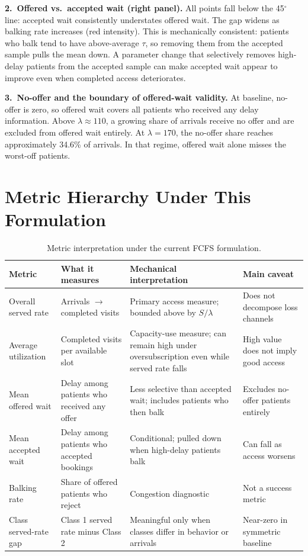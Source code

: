 \documentclass[11pt]{article}
\begin{document}
\textbf{2.~Offered vs.\ accepted wait (right panel).}
All points fall below the 45$^\circ$ line: accepted wait consistently
understates offered wait. The gap widens as balking rate increases (red
intensity). This is mechanically consistent: patients who balk tend to have
above-average $\tau$, so removing them from the accepted sample pulls the
mean down. A parameter change that selectively removes high-delay patients from the
accepted sample can make accepted wait appear to improve even when completed
access deteriorates.

\textbf{3.~No-offer and the boundary of offered-wait validity.}
At baseline, no-offer is zero, so offered wait covers all patients who
received any delay information. Above $\lambda \approx 110$, a growing
share of arrivals receive no offer and are excluded from offered wait
entirely. At $\lambda = 170$, the no-offer share reaches approximately
34.6\% of arrivals. In that regime, offered wait alone misses the
worst-off patients.

\section{Metric Hierarchy Under This Formulation}
\label{sec:metrics}

\begin{table}[H]
\centering
\renewcommand{\arraystretch}{1.2}
\begin{tabular}{p{}p{}p{}p{}}
\toprule
Metric & What it measures & Mechanical interpretation & Main caveat \\
\midrule
Overall served rate & Arrivals $\to$ completed visits & Primary access measure; bounded above by $S/\lambda$ & Does not decompose loss channels \\
Average utilization & Completed visits per available slot & Capacity-use measure; can remain high under oversubscription even while served rate falls & High value does not imply good access \\
Mean offered wait & Delay among patients who received any offer & Less selective than accepted wait; includes patients who then balk & Excludes no-offer patients entirely \\
Mean accepted wait & Delay among patients who accepted bookings & Conditional; pulled down when high-delay patients balk & Can fall as access worsens \\
Balking rate & Share of offered patients who reject & Congestion diagnostic & Not a success metric \\
Class served-rate gap & Class 1 served rate minus Class 2 & Meaningful only when classes differ in behavior or arrivals & Near-zero in symmetric baseline \\
\bottomrule
\end{tabular}
\caption{Metric interpretation under the current FCFS formulation.}
\label{tab:metrics}
\end{table}
\end{document}
